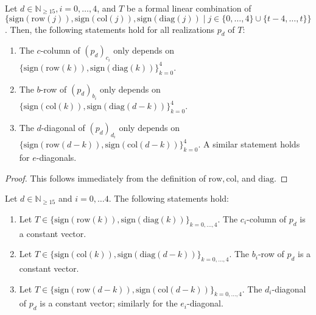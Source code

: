 \begin{proposition}\label{prop:nwfiewnfiuwneufni2un2}
    Let \( d \in \mathbb{N}_{\geq 15} , i  = 0, \dots, 4\), and $T$ be a formal linear combination of \(  \{ \mathrm{sign}(\mathrm{row}(j)), \mathrm{sign}(\mathrm{col}(j)), \mathrm{sign}(\mathrm{diag}(j)) \mid j \in \{ 0, \dots, 4\} \cup \{ t-4, \dots, t \} \} \).
Then, the following statements hold for all realizations \( p_d \) of \( T \):
  \begin{enumerate}
  \item The $c$-column of $(p_d)_{c_i}$ only depends on $\{ \mathrm{sign}(\mathrm{row}(k)), \mathrm{sign}(\mathrm{diag}(k)) \}_{k = 0}^4$.
  \item The $b$-row of $(p_d)_{b_i}$ only depends on $\{ \mathrm{sign}(\mathrm{col}(k)), \mathrm{sign}(\mathrm{diag}(d-k)) \}_{k = 0}^4$.
  \item The $d$-diagonal of $(p_d)_{d_i}$ only depends on \(\{ \mathrm{sign}(\mathrm{row}(d-k)), \mathrm{sign}(\mathrm{col}(d-k)) \}_{k = 0}^4 \). A similar statement holds for $e$-diagonals.
  \end{enumerate}
  \end{proposition}
  
  \begin{proof}
   This follows immediately from the definition of $\mathrm{row}, \mathrm{col}$, and $\mathrm{diag}$.
  \end{proof}

  \begin{proposition}
    Let \( d \in \mathbb{N}_{\geq 15} \) and \( i = 0, \dots 4 \).
    The following statements hold:
    \begin{enumerate}
    \item Let $T \in \{\mathrm{sign}(\mathrm{row}(k)), \mathrm{sign}(\mathrm{diag}(k)) \}_{k = 0, \dots, 4}$. The $c_{i}$-column of $p_d$ is a constant vector. 
  
    \item Let $T \in \{\mathrm{sign}( \mathrm{col}(k)),\mathrm{sign}(\mathrm{diag}(d-k)) \}_{k = 0, \dots, 4}$. The $b_{i}$-row of $p_d$ is a constant vector. 
  
    \item Let $T \in \{ \mathrm{sign}(\mathrm{row}(d-k)), \mathrm{sign}(\mathrm{col}(d-k)) \}_{k = 0, \dots, 4}$. The $d_{i}$-diagonal of $p_d$ is a constant vector; similarly for the $e_{i}$-diagonal. 
    \end{enumerate}
  \end{proposition}
  
